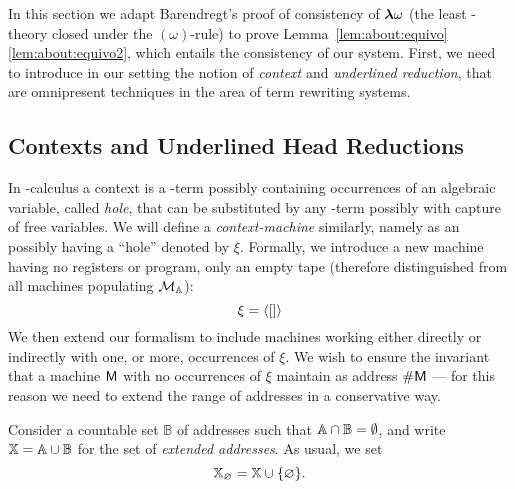 \renewcommand\hole[1]{\llparenthesis#1\rrparenthesis}
\newcommand{\Count}{\omega_1}
\newcommand{\occ}[1]{\mathrm{occ}_\xi(#1)}
\newcommand{\pesc}[1][\alpha]{\approx_{#1}}
\newcommand{\svirg}[1][\alpha]{\sim_{#1}}
\newcommand{\eq}[1][\alpha]{\equiv_{#1}}
\newcommand{\ured}[1][M]{\redh^{\mach{#1}}}
\newcommand{\uredd}[1][M]{\reddh^{\mach{#1}}}
\newcommand{\XX}{\mathbb{X}}
\newcommand{\X}{\mach{X}}
\newcommand{\BB}{\mathbb{B}}
\newcommand{\cMX}{\cM[\XX]^\xi}
\newcommand{\Lup}{\underline{\#}}
\newcommand{\Luinv}[1]{\underline{\#}^{-1}(#1)}

In this section we adapt Barendregt's proof of consistency of $\boldsymbol{\lambda}\omega$ (the least \lam-theory closed under the $(\omega)$-rule) to prove Lemma~\ref{lem:about:equivo}\ref{lem:about:equivo2}, which entails the consistency of our system.
First, we need to introduce in our setting the notion of \emph{context} and \emph{underlined reduction}, that are omnipresent techniques in the area of term rewriting systems.

\subsection{Contexts and Underlined Head Reductions}

In \lam-calculus a context is a \lam-term possibly containing occurrences of an algebraic variable, called \emph{hole}, that can be substituted by any \lam-term possibly with capture of free variables.
We will define a \emph{context-machine} similarly, namely as an \am{} possibly having a ``hole'' denoted by $\xi$. Formally, we introduce a new machine having no registers or program, only an empty tape (therefore distinguished from all machines populating $\mathcal{M}_{\mathbb{A}}$):
\[
	\xi = \langle []\rangle
\]
We then extend our formalism to include machines working either directly or indirectly with one, or more, occurrences of $\xi$. We wish to ensure the invariant that a machine $\mathsf M$ with no occurrences of $\xi$ maintain as address $\#\mathsf M$ --- for this reason we need to extend the range of addresses in a conservative way.

Consider a countable set $\BB$ of addresses such that $\Addrs\cap\BB = \emptyset$, and write $\XX = \Addrs\cup\BB$ for the set of \emph{extended addresses}. As usual, we set \[\XX_\Null = \XX\cup\set{\Null}.\]

